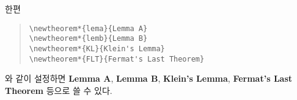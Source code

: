 \documentclass[a4paper,10pt]{amsproc}
\newlength\hunindentlen
\def\gethunindentlen#1{%
 \sbox{\mybox}{\textbf{#1.}}%
 \setlength\hunindentlen{\wd\mybox}%
 \addtolength\hunindentlen{5mm}%
}
\begin{document}
한편
\begin{quote}
\noindent\gethunindentlen{예 7}
\hspace*{-\hunindentlen}\usebox{\mybox}\hspace{4mm}\verb|\newtheorem*{lema}{Lemma A}| \\
   \verb|\newtheorem*{lemb}{Lemma B}| \\
   \verb|\newtheorem*{KL}{Klein's Lemma}| \\
   \verb|\newtheorem*{FLT}{Fermat's Last Theorem}|
\end{quote}
와 같이 설정하면 \textbf{Lemma A}, \textbf{Lemma B}, \textbf{Klein's
  Lemma}, \textbf{Fermat's Last Theorem} 등으로 쓸 수 있다.
\end{document}
